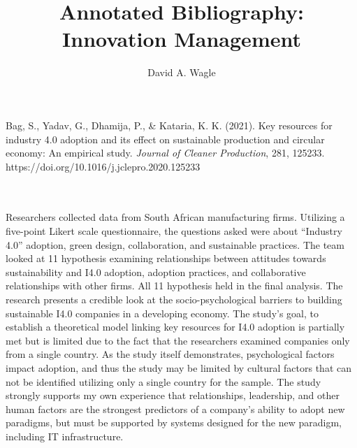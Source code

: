 \documentclass{apa7}
\begin{document}
\title{Annotated Bibliography: Innovation Management}

\author{David A. Wagle}




\maketitle

\hfill\begin{minipage}{\dimexpr\textwidth-1in}
\begin{hangparas}{.25in}{1}
Bag, S., Yadav, G., Dhamija, P., \& Kataria, K. K. (2021). Key resources for industry 4.0 adoption and its effect on sustainable production and circular economy: An empirical study. \textit{Journal of Cleaner Production}, 281, 125233. https://doi.org/10.1016/j.jclepro.2020.125233
\end{hangparas}
\xdef\tpd{\the\prevdepth}
\end{minipage}
\\
\\
Researchers collected data from South African manufacturing firms. Utilizing a five-point Likert scale questionnaire, the questions asked were about ``Industry 4.0'' adoption, green design, collaboration, and sustainable practices. The team looked at 11 hypothesis examining relationships between attitudes towards sustainability and I4.0 adoption, adoption practices, and collaborative relationships with other firms. All 11 hypothesis held in the final analysis. The research presents a credible look at the socio-psychological barriers to building sustainable I4.0 companies in a developing economy. The study's goal, to establish a theoretical model linking key resources for I4.0 adoption is partially met but is limited due to the fact that the researchers examined companies only from a single country. As the study itself demonstrates, psychological factors impact adoption, and thus the study may be limited by cultural factors that can not be identified utilizing only a single country for the sample. The study strongly supports my own experience that relationships, leadership, and other human factors are the strongest predictors of a company's ability to adopt new paradigms, but must be supported by systems designed for the new paradigm, including IT infrastructure.
\end{document}
